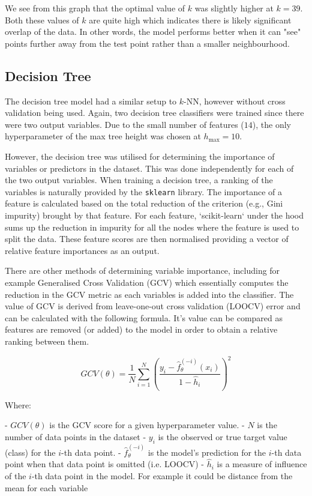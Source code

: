 \documentclass{article}
\begin{document}
We see from this graph that the optimal value of $k$ was slightly higher at $k = 39$. Both these values of $k$ are quite high which indicates there is likely significant overlap of the data. In other words, the model performs better when it can "see" points further away from the test point rather than a smaller neighbourhood.

\subsection{Decision Tree}

The decision tree model had a similar setup to $k$-NN, however without cross validation being used. Again, two decision tree classifiers were trained since there were two output variables. Due to the small number of features ($14$), the only hyperparameter of the max tree height was chosen at $h_{\text{max}} = 10$.

However, the decision tree was utilised for determining the importance of variables or predictors in the dataset. This was done independently for each of the two output variables. When training a decision tree, a ranking of the variables is naturally provided by the \texttt{sklearn} library. The importance of a feature is calculated based on the total reduction of the criterion (e.g., Gini impurity) brought by that feature. For each feature, `scikit-learn` under the hood sums up the reduction in impurity for all the nodes where the feature is used to split the data. These feature scores are then normalised providing a vector of relative feature importances as an output.

There are other methods of determining variable importance, including for example Generalised Cross Validation (GCV) which essentially computes the reduction in the GCV metric as each variables is added into the classifier. The value of GCV is derived from leave-one-out cross validation (LOOCV) error and can be calculated with the following formula. It's value can be compared as features are removed (or added) to the model in order to obtain a relative ranking between them.

$$GCV(\theta) = \frac{1}{N}\sum_{i=1}^{N}\left(\frac{y_i - \hat{f}_\theta^{(-i)}(x_i)}{1-\hat{h}_i}\right)^2$$

Where:

- $GCV(\theta)$ is the GCV score for a given hyperparameter value. 
- $N$ is the number of data points in the dataset
- $y_i$ is the observed or true target value (class) for the $i$-th data point.
- $\hat{f}_\theta^{(-i)}$ is the model's prediction for the $i$-th data point when that data point is omitted (i.e. LOOCV)
- $\hat{h}_i$ is a measure of influence of the $i$-th data point in the model. For example it could be distance from the mean for each variable 
\end{document}
